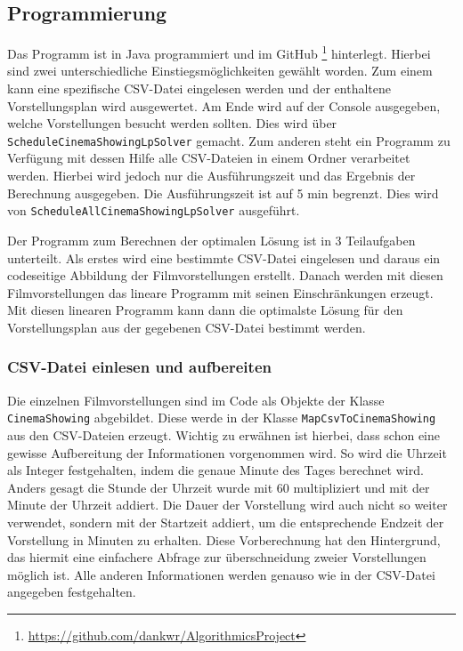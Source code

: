\documentclass[a4paper, 12pt]{article}
\begin{document}
\subsection{Programmierung}

Das Programm ist in Java programmiert und im GitHub \footnote{\url{https://github.com/dankwr/AlgorithmicsProject}} hinterlegt.
Hierbei sind zwei unterschiedliche Einstiegsmöglichkeiten gewählt worden. 
Zum einem kann eine spezifische CSV-Datei eingelesen werden und der enthaltene Vorstellungsplan wird ausgewertet.
Am Ende wird auf der Console ausgegeben, welche Vorstellungen besucht werden sollten. 
Dies wird über \texttt{ScheduleCinemaShowingLpSolver} gemacht.
Zum anderen steht ein Programm zu Verfügung mit dessen Hilfe alle CSV-Dateien in einem Ordner verarbeitet werden.
Hierbei wird jedoch nur die Ausführungszeit und das Ergebnis der Berechnung ausgegeben.
Die Ausführungszeit ist auf 5 min begrenzt.
Dies wird von \linebreak \texttt{ScheduleAllCinemaShowingLpSolver} ausgeführt.

Der Programm zum Berechnen der optimalen Lösung ist in 3 Teilaufgaben unterteilt. 
Als erstes wird eine bestimmte CSV-Datei eingelesen und daraus ein codeseitige Abbildung der Filmvorstellungen erstellt.
Danach werden mit diesen Filmvorstellungen das lineare Programm mit seinen Einschränkungen erzeugt.
Mit diesen linearen Programm kann dann die optimalste Lösung für den Vorstellungsplan aus der gegebenen CSV-Datei bestimmt werden.

\subsubsection{CSV-Datei einlesen und aufbereiten}

Die einzelnen Filmvorstellungen sind im Code als Objekte der Klasse \linebreak \texttt{CinemaShowing} abgebildet.
Diese werde in der Klasse  \linebreak \texttt{MapCsvToCinemaShowing} aus den CSV-Dateien erzeugt.
Wichtig zu erwähnen ist hierbei, dass schon eine gewisse Aufbereitung der Informationen vorgenommen wird.
So wird die Uhrzeit als Integer festgehalten, indem die genaue Minute des Tages berechnet wird. 
Anders gesagt die Stunde der Uhrzeit wurde mit 60 multipliziert und mit der Minute der Uhrzeit addiert.
Die Dauer der Vorstellung wird auch nicht so weiter verwendet, sondern mit der Startzeit addiert, um die entsprechende Endzeit der Vorstellung in Minuten zu erhalten.
Diese Vorberechnung hat den Hintergrund, das hiermit eine einfachere Abfrage zur überschneidung zweier Vorstellungen möglich ist.
Alle anderen Informationen werden genauso wie in der CSV-Datei angegeben festgehalten.
\end{document}
